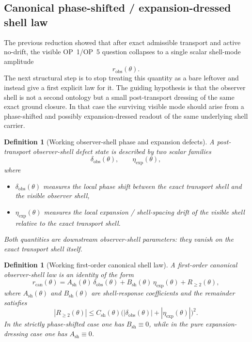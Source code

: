 \documentclass[12pt,a4paper]{article}
\newtheorem{definition}[theorem]{Definition}
\begin{document}
\subsection*{Canonical phase-shifted / expansion-dressed shell law}
The previous reduction showed that after exact admissible transport and active no-drift, the visible OP~1/OP~5 question collapses to a single scalar shell-mode amplitude
\[
 r_{\mathrm{obs}}(\theta).
\]
The next structural step is to stop treating this quantity as a bare leftover and instead give a first explicit law for it. The guiding hypothesis is that the observer shell is not a second ontology but a small post-transport dressing of the same exact ground closure. In that case the surviving visible mode should arise from a phase-shifted and possibly expansion-dressed readout of the same underlying shell carrier.

\begin{definition}[Working observer-shell phase and expansion defects]
A post-transport observer-shell defect state is described by two scalar families
\[
 \delta_{\mathrm{obs}}(\theta),
 \qquad
 \eta_{\mathrm{exp}}(\theta),
\]
where
\begin{itemize}[leftmargin=2em]
\item $\delta_{\mathrm{obs}}(\theta)$ measures the local phase shift between the exact transport shell and the visible observer shell,
\item $\eta_{\mathrm{exp}}(\theta)$ measures the local expansion / shell-spacing drift of the visible shell relative to the exact transport shell.
\end{itemize}
Both quantities are downstream observer-shell parameters: they vanish on the exact transport shell itself.
\end{definition}

\begin{definition}[Working first-order canonical shell law]
A first-order canonical observer-shell law is an identity of the form
\[
 r_{\mathrm{can}}(\theta)
 =A_{\mathrm{sh}}(\theta)\,\delta_{\mathrm{obs}}(\theta)
 +B_{\mathrm{sh}}(\theta)\,\eta_{\mathrm{exp}}(\theta)
 +R_{\ge 2}(\theta),
\]
where $A_{\mathrm{sh}}(\theta)$ and $B_{\mathrm{sh}}(\theta)$ are shell-response coefficients and the remainder satisfies
\[
 |R_{\ge 2}(\theta)|
 \le C_{\mathrm{sh}}(\theta)
 \bigl(|\delta_{\mathrm{obs}}(\theta)|+|\eta_{\mathrm{exp}}(\theta)|\bigr)^2.
\]
In the strictly phase-shifted case one has $B_{\mathrm{sh}}\equiv 0$, while in the pure expansion-dressing case one has $A_{\mathrm{sh}}\equiv 0$.
\end{definition}
\end{document}

